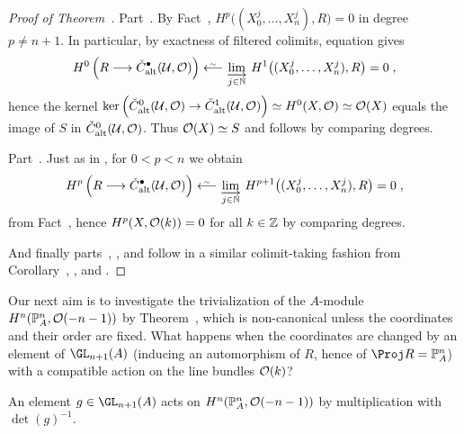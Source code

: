\documentclass[a4paper,parskip=half,numbers=enddot, DIV=12]{scrreprt}
\begin{document}
\begin{proof}[Proof of Theorem~]
	Part~. By Fact~, $H^p\big((X_0^j,\ldots,X_n^j),R\big)=0$ in degree $p\neq n+1$. In particular, by exactness of filtered colimits, equation  gives
	\begin{align*}
		H^0\left(R\morphism\check{C}_\alt^\bullet(\Uu,\Oo)\right)\lisomorphism\colimit[j\in\IN]H^1\big((X_0^j,\ldots,X_n^j),R\big)=0\;,
	\end{align*}
	hence the kernel $\ker\left(\check{C}_\alt^0(\Uu,\Oo)\morphism\check{C}_\alt^1(\Uu,\Oo)\right)\simeq H^0(X,\Oo)\simeq \Oo(X)$ equals the image of $S$ in $\check{C}_{\mathrm{alt}}^0(\mathcal{U},\mathcal{O})$. Thus $\mathcal{O}(X)\simeq S$ and  follows by comparing degrees.
	
	Part~. Just as in , for $0<p<n$ we obtain
	\begin{align*}
		H^p\left(R\morphism\check{C}_\alt^\bullet(\Uu,\Oo)\right)\lisomorphism\colimit[j\in\IN]H^{p+1}\big((X_0^j,\ldots,X_n^j),R\big)=0\;,
	\end{align*}
	from Fact~, hence $H^p(X,\mathcal{O}(k))=0$ for all $k\in\mathbb{Z}$ by comparing degrees.
	
	And finally parts~, , and  follow in a similar colimit-taking fashion from Corollary~, , and .
\end{proof}
Our next aim is to investigate the trivialization of the $A$-module $H^n(\mathbb{P}_A^n,\mathcal{O}(-n-1))$ by Theorem~, which is non-canonical unless the coordinates and their order are fixed. What happens when the coordinates are changed by an element of $\GL_{n+1}(A)$ (inducing an automorphism of $R$, hence of $\Proj R=\IP_A^n$) with a compatible action on the line bundles $\mathcal{O}(k)$?
\begin{lem}
	An element $g\in\GL_{n+1}(A)$ acts on $H^n(\mathbb{P}_A^n,\mathcal{O}(-n-1))$ by multiplication with $\det(g)^{-1}$.
\end{lem}
\end{document}
